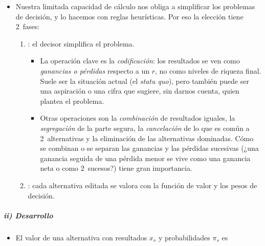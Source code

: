 \documentclass[11pt]{article}
\begin{document}
\begin{itemize}
\item Nuestra limitada capacidad de cálculo nos obliga a simplificar los problemas de decisión, y lo hacemos con reglas heurísticas. Por eso la elección tiene 2~fases:
  \begin{enumerate}
  \item {}: el decisor simplifica el problema.
    \begin{itemize}
    \item La operación clave es la \emph{codificación}: los resultados se ven como \emph{ganancias o pérdidas} respecto a un  $r$, no como niveles de riqueza final. Suele ser la situación actual (el \emph{statu quo}), pero también puede ser una aspiración o una cifra que sugiere, sin darnos cuenta, quien plantea el problema.
    \item Otras operaciones son la \emph{combinación} de resultados iguales, la \emph{segregación} de la parte segura, la \emph{cancelación} de lo que es común a 2~alternativas y la eliminación de las alternativas dominadas. Cómo se combinan o se separan las ganancias y las pérdidas sucesivas (¿una ganancia seguida de una pérdida menor se vive como una ganancia neta o como 2~sucesos?) tiene gran importancia.
    \end{itemize}
  \item {}: cada alternativa editada se valora con la función de valor y los pesos de decisión.
  \end{enumerate}
\end{itemize}

\subparagraph{ii) Desarrollo}

\begin{itemize}
\item El valor de una alternativa con resultados $x_s$ y probabilidades $\pi_s$ es
\end{itemize}
\end{document}
